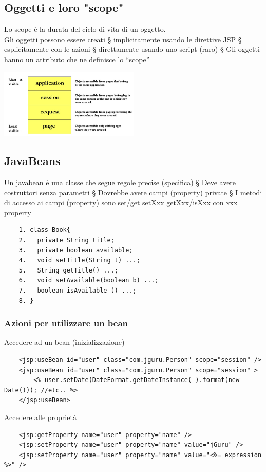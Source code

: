\begin{itemize}
\subsection{Oggetti e loro "scope"}
Lo scope è la durata del ciclo di vita di un oggetto.
\\Gli oggetti possono essere creati
§ implicitamente usando le direttive JSP
§ esplicitamente con le azioni
§ direttamente usando uno script (raro)
§ Gli oggetti hanno un attributo che ne definisce lo “scope”
\begin{center}
    \includegraphics[width=0.5\textwidth]{img/appWeb19.jpg}
\end{center}

\subsection{JavaBeans}
Un javabean è una classe che segue regole precise (specifica)
§ Deve avere costruttori senza parametri
§ Dovrebbe avere campi (property) private
§ I metodi di accesso ai campi (property) sono set/get
setXxx
getXxx/isXxx
con xxx = property
\begin{verbatim}
    1. class Book{
    2.   private String title;
    3.   private boolean available;
    4.   void setTitle(String t) ...;
    5.   String getTitle() ...;
    6.   void setAvailable(boolean b) ...;
    7.   boolean isAvailable () ...;
    8. }
\end{verbatim}

\subsubsection{Azioni per utilizzare un bean}
Accedere ad un bean (inizializzazione)
\begin{verbatim}
    <jsp:useBean id="user" class="com.jguru.Person" scope="session" />
    <jsp:useBean id="user" class="com.jguru.Person" scope="session" >
        <% user.setDate(DateFormat.getDateInstance( ).format(new Date())); //etc.. %>
    </jsp:useBean>
\end{verbatim}
Accedere alle proprietà
\begin{verbatim}
    <jsp:getProperty name="user" property="name" />
    <jsp:setProperty name="user" property="name" value="jGuru" />
    <jsp:setProperty name="user" property="name" value="<%= expression %>" />
\end{verbatim}


\end{itemize}
